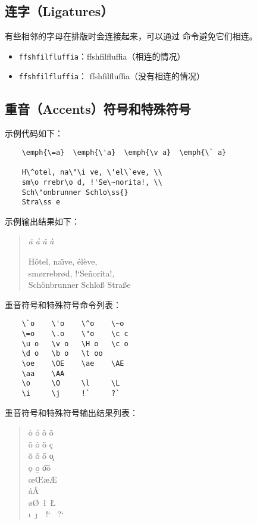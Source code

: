 \documentclass[UTF8]{ctexart}
\begin{document}
\subsection{连字（Ligatures）}
有些相邻的字母在排版时会连接起来，可以通过 \texttt{\mbox{}} 命令避免它们相连。
\begin{itemize}
    \item \texttt{ffshfilfluffia}：ffshfilfluffia（相连的情况）
    \item \texttt{f\mbox{}fshf\mbox{}ilf\mbox{}luf\mbox{}f\mbox{}ia}：
    f\mbox{}fshf\mbox{}ilf\mbox{}luf\mbox{}f\mbox{}ia（没有相连的情况）
\end{itemize}

\subsection{重音（Accents）符号和特殊符号}
示例代码如下：
\begin{verbatim}
    \emph{\=a}  \emph{\'a}  \emph{\v a}  \emph{\` a}

    H\^otel, na\"\i ve, \'el\`eve, \\
    sm\o rrebr\o d, !'Se\~norita!, \\
    Sch\"onbrunner Schlo\ss{}
    Stra\ss e
\end{verbatim}

示例输出结果如下：
\begin{quote}
    \emph{\=a} \qquad \emph{\'a} \qquad \emph{\v a} \qquad \emph{\` a}

    H\^otel, na\"\i ve, \'el\`eve, \\
    sm\o rrebr\o d, !`Se\~norita!, \\
    Sch\"onbrunner Schlo\ss{}
    Stra\ss e
\end{quote}

重音符号和特殊符号命令列表：
\begin{verbatim}
    \`o    \'o    \^o    \~o
    \=o    \.o    \"o    \c c
    \u o   \v o   \H o   \c o
    \d o   \b o   \t oo
    \oe    \OE    \ae    \AE
    \aa    \AA
    \o     \O     \l     \L
    \i     \j     !`     ?`
\end{verbatim}

重音符号和特殊符号输出结果列表：
\begin{quote}
    \`o  \qquad  \'o  \qquad  \^o  \qquad  \~o \\
    \=o  \qquad  \.o  \qquad  \"o  \qquad  \c c \\
    \u o \qquad  \v o \qquad  \H o \qquad  \c o \\
    \d o \qquad  \b o \qquad  \t oo \\
    \oe  \qquad  \OE  \qquad  \ae  \qquad  \AE \\
    \aa  \qquad  \AA \\
    \o   \qquad  \O   ~\qquad  \l   ~\qquad  \L \\
    \i   ~\qquad  \j   ~~\qquad  !`   ~\qquad  ?` \\
\end{quote}
\end{document}
